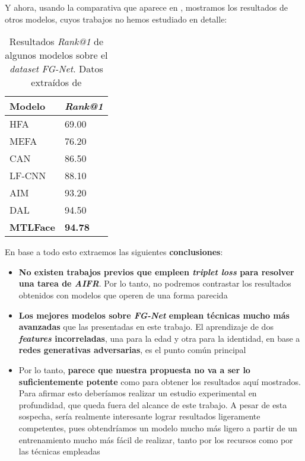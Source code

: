 Y ahora, usando la comparativa que aparece en \cite{informatica:best_fgnet_model}, mostramos los resultados de otros modelos, cuyos trabajos no hemos estudiado en detalle:

\begin{table}[H]
\centering
\begin{tabular}{|l|l|}
    \hline
    Modelo & \textit{Rank@1} \\
    \hline
    HFA & 69.00 \\
    MEFA & 76.20 \\
    CAN & 86.50 \\
    LF-CNN & 88.10 \\
    AIM & 93.20 \\
    DAL & 94.50 \\
    \textbf{MTLFace} & \textbf{94.78} \\
    \hline
\end{tabular}
\caption{Resultados \textit{Rank@1} de algunos modelos sobre el \textit{dataset} \textit{FG-Net}. Datos extraídos de \cite{informatica:best_fgnet_model}}
\end{table}

En base a todo esto extraemos las siguientes \textbf{conclusiones}:

\begin{itemize}
    \item \textbf{No existen trabajos previos que empleen \textit{triplet loss} para resolver una tarea de \textit{AIFR}}. Por lo tanto, no podremos contrastar los resultados obtenidos con modelos que operen de una forma parecida
    \item \textbf{Los mejores modelos sobre \textit{FG-Net} emplean técnicas mucho más avanzadas} que las presentadas en este trabajo. El aprendizaje de dos \textbf{\textit{features} incorreladas}, una para la edad y otra para la identidad, en base a \textbf{redes generativas adversarias}, es el punto común principal
    \item Por lo tanto, \textbf{parece que nuestra propuesta no va a ser lo suficientemente potente} como para obtener los resultados aquí mostrados. Para afirmar esto deberíamos realizar un estudio experimental en profundidad, que queda fuera del alcance de este trabajo. A pesar de esta sospecha, sería realmente interesante lograr resultados ligeramente competentes, pues obtendríamos un modelo mucho más ligero a partir de un entrenamiento mucho más fácil de realizar, tanto por los recursos como por las técnicas empleadas
\end{itemize}
